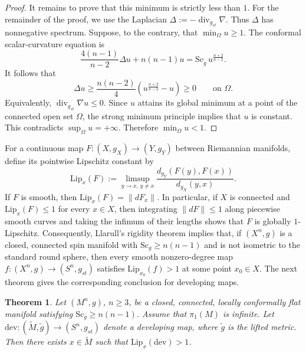 \documentclass[12pt,oneside,a4paper]{article}
\theoremstyle{mytheorem}
\newtheorem{theorem}[definition]{Theorem}
\theoremstyle{remark}
\theoremstyle{definition}
\begin{document}
\begin{proof}
It remains to prove that this minimum is strictly less than \(1\).
For the remainder of the proof, we use the Laplacian
\(\Delta:=-\operatorname{div}_{g_{st}}\nabla\).
Thus $\Delta$ has nonnegative spectrum.
Suppose, to the contrary, that \(\min_{\Omega}u\geq1\). The conformal
scalar-curvature equation is
\[
\frac{4(n-1)}{n-2}\Delta u+n(n-1)u
=
\mathrm{Sc}_{\tilde g}\,
u^{\frac{n+2}{n-2}}.
\]
It follows that
\[
\Delta u
\geq
\frac{n(n-2)}4
\left(u^{\frac{n+2}{n-2}}-u\right)
\geq0
\qquad\text{on }\Omega.
\]
Equivalently,
\(\operatorname{div}_{g_{st}}\nabla u\leq0\). Since \(u\) attains its
global minimum at a point of the connected open set \(\Omega\), the
strong minimum principle implies that \(u\) is constant. This
contradicts \(\sup_{\Omega}u=+\infty\). Therefore
\(\min_{\Omega}u<1\).
\end{proof}


For a continuous map \(F\colon(X,g_X)\to(Y,g_Y)\) between Riemannian
manifolds, define its pointwise Lipschitz constant by
\[
\mathrm{Lip}_x(F):=\limsup_{y\to x,\,y\neq x}
\frac{d_{g_Y}(F(y),F(x))}{d_{g_X}(y,x)}.
\]
If $F$ is smooth, then $\mathrm{Lip}_x(F)=\|dF_x\|$. In particular, if
$X$ is connected and $\mathrm{Lip}_x(F)\leq1$ for every $x\in X$, then
integrating $\|dF\|\leq1$ along piecewise smooth curves and taking the
infimum of their lengths shows that $F$ is globally $1$-Lipschitz.
Consequently, Llarull's rigidity theorem implies that, if
$(X^n,g)$ is a closed, connected spin manifold with
$\mathrm{Sc}_g\geq n(n-1)$ and is not isometric to the standard round
sphere, then every smooth nonzero-degree map
\(f\colon(X^n,g)\to(S^n,g_{st})\) satisfies
$\mathrm{Lip}_{x_0}(f)>1$ at some point $x_0\in X$.
The next theorem gives the corresponding conclusion for developing maps.


\begin{theorem}\label{dev}
Let \((M^{n},g)\), \(n\geq3\), be a closed, connected, locally
conformally flat manifold satisfying
\(\mathrm{Sc}_{g}\geq n(n-1)\). Assume that $\pi_1(M)$ is infinite. Let
\(\mathrm{dev}\colon(\widetilde M,\tilde g)\to (S^n,g_{st})\)
denote a developing map, where \(\tilde g\) is the lifted metric. Then
there exists \(x\in\widetilde M\) such that
\(\mathrm{Lip}_{x}(\mathrm{dev})>1\).
\end{theorem}
\end{document}
